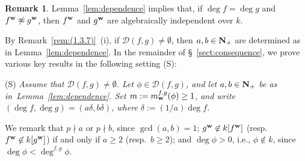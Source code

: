 \documentclass{amsart}
\theoremstyle{plain}
\theoremstyle{definition}
\newtheorem{rem}[thm]{Remark}
\newcommand{\nd}{\noindent}
\newcommand{\N}{{\bf N}}
\newcommand{\w}{{\bf w}}
\newcommand{\degw  }{\deg}
\begin{document}
\begin{rem}\label{rem:dependence}\rm 
Lemma~\ref{lem:dependence} implies that, 
if $\degw f=\degw g$ and $f^{\w }\not\approx g^{\w }$, 
then $f^{\w }$ and $g^{\w }$ are 
algebraically independent over $k$. 
\end{rem}



By Remark~\ref{rem:(1.3.7)}~(i), 
if $\mathcal{D}(f,g)\ne \emptyset $, 
then 
$a,b\in \N _+$ are determined as in Lemma~\ref{lem:dependence}. 
In 
the remainder of 
\S \ \ref{sect:consequence}, 
we prove various key results in the following setting (S): 

\smallskip 


\nd 
(S) {\it 
Assume that $\mathcal{D}(f,g)\ne \emptyset $. 
Let $\phi \in \mathcal{D}(f,g)$, 
and let $a,b\in \N _+$ be as in~Lemma~{\rm \ref{lem:dependence}}. 
Set $m:=m_{\w }^{f,g}(\phi )\ge 1$, 
and write~$(\deg f,\deg g)=(a\delta ,b\delta )$, 
where $\delta :=(1/a)\degw f$. 
} 


\smallskip 


We remark that 
$p\nmid a$ or $p\nmid b$, since $\gcd (a,b)=1$; 
$g^{\w }\not\in k[f^{\w }]$ (resp.\ $f^{\w }\not\in k[g^{\w }]$) 
if and only if $a\ge 2$ (resp.\ $b\ge 2$); 
and $\deg \phi >0$, i.e., $\phi \not\in k$, 
since $\deg \phi <\deg ^{f,g}\phi $. 
\end{document}
